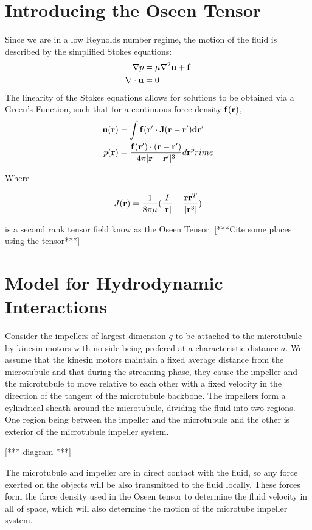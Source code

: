 \documentclass[pre,showpacs]{revtex4}
\def\br{{\bf r}}
\begin{document}
\section{Introducing the Oseen Tensor}
Since we are in a low Reynolds number regime, the motion of the fluid is described by the simplified Stokes equations:
\begin{align}
\label{eq:stokeseqns}
\nabla p &= \mu \nabla^2 \bf u + \bf f \\
\nabla \cdot \bf u &= 0
\end{align}
The linearity of the Stokes equations allows for solutions to be obtained via a Green's Function, such that for a continuous force density $\bf f(\bf r)$,
\begin{align}
\label{eq:fluidgreensfunc}
\bf u(\bf r ) &= \int \bf f(\bf r^\prime \cdot \bf J (\bf r - \bf r^\prime) d\bf r^\prime \\
p(\bf r) &= \frac{\bf f(\bf r^\prime) \cdot (\br - \br^\prime)}{4 \pi | \br - \br^\prime|^3} d\br^prime
\end{align}

Where 

\begin{equation}
\label{eq:oseentensordef}
J(\br) = \frac{1}{8\pi\mu} ( \frac{I}{|\br|} + \frac{\br\br^T}{|\br^3|})
\end{equation}

is a second rank tensor field know as the Oseen Tensor.
[***Cite some places using the tensor***]

\section{Model for Hydrodynamic Interactions}

Consider the impellers of largest dimension $q$ to be attached to the microtubule by kinesin motors with no side being prefered at a characteristic distance $a$. We assume that the kinesin motors maintain a fixed average distance from the microtubule and that during the streaming phase, they cause the impeller and the microtubule to move relative to each other with a fixed velocity in the direction of the tangent of the microtubule backbone. 
The impellers form a cylindrical sheath around the microtubule, dividing the fluid into two regions. One region being between the impeller and the microtubule and the other is exterior of the microtubule impeller system. 

[*** diagram ***]

The microtubule and impeller are in direct contact with the fluid, so any force exerted on the objects will be also transmitted to the fluid locally. These forces form the force density used in the Oseen tensor to determine the fluid velocity in all of space, which will also determine the motion of the microtube impeller system.
\end{document}
